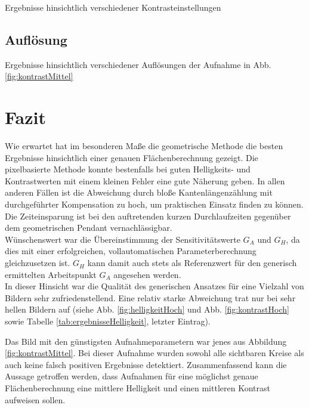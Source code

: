 \documentclass[accentcolor=tud1c, 11pt, toc=bib, toc=listof, captions=abovetable, parskip=half]{tudreport}
\begin{document}
\begin{table}
	\caption{Ergebnisse hinsichtlich verschiedener Kontrasteinstellungen}
	\centering
	
	\label{tab:ergebnisseKontrast}
\end{table}

\subsection{Auflösung}

\begin{table}[h!]
	\caption{Ergebnisse hinsichtlich verschiedener Auflösungen der Aufnahme in Abb. \ref{fig:kontrastMittel}}
	\centering
	
	\label{tab:ergebnisseAuflösung}
\end{table}

\section{Fazit}
Wie erwartet hat im besonderen Maße die geometrische Methode die besten Ergebnisse hinsichtlich einer genauen Flächenberechnung gezeigt. Die pixelbasierte Methode konnte bestenfalls bei guten Helligkeits- und Kontrastwerten mit einem kleinen Fehler eine gute Näherung geben. In allen anderen Fällen ist die Abweichung durch bloße Kantenlängenzählung mit durchgeführter Kompensation zu hoch, um praktischen Einsatz finden zu können. Die Zeiteinsparung ist bei den auftretenden kurzen Durchlaufzeiten gegenüber dem geometrischen Pendant vernachlässigbar.\\

Wünschenswert war die Übereinstimmung der Sensitivitätswerte $G_A$ und $G_H$, da dies mit einer erfolgreichen, vollautomatischen Parameterberechnung gleichzusetzen ist. $G_H$ kann damit auch stets als Referenzwert für den generisch ermittelten Arbeitspunkt $G_A$ angesehen werden.\\
In dieser Hinsicht war die Qualität des generischen Ansatzes für eine Vielzahl von Bildern sehr zufriedenstellend. Eine relativ starke Abweichung trat nur bei sehr hellen Bildern auf (siehe Abb. \ref{fig:helligkeitHoch} und Abb. \ref{fig:kontrastHoch} sowie Tabelle \ref{tab:ergebnisseHelligkeit}, letzter Eintrag).

Das Bild mit den günstigsten Aufnahmeparametern war jenes aus Abbildung \ref{fig:kontrastMittel}. Bei dieser Aufnahme wurden sowohl alle sichtbaren Kreise als auch keine falsch positiven Ergebnisse detektiert. Zusammenfassend kann die Aussage getroffen werden, dass Aufnahmen für eine möglichst genaue Flächenberechnung eine mittlere Helligkeit und einen mittleren Kontrast aufweisen sollen.
\end{document}
